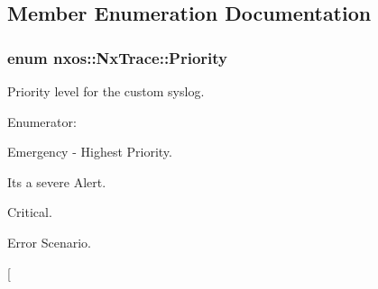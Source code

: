 \subsection{Member Enumeration Documentation}
\hypertarget{classnxos_1_1NxTrace_a582f6e5a22e788c61807657f8bca088f}{
\subsubsection[{Priority}]{\setlength{\rightskip}{0pt plus 5cm}enum {\bf nxos::NxTrace::Priority}}}
\label{classnxos_1_1NxTrace_a582f6e5a22e788c61807657f8bca088f}
Priority level for the custom syslog. \begin{Desc}
\item[Enumerator: ]\par
\begin{description}
\item[{\em 
\hypertarget{classnxos_1_1NxTrace_a582f6e5a22e788c61807657f8bca088fa162b57da846293468dd47af10c603df2}{
EMERG}
\label{classnxos_1_1NxTrace_a582f6e5a22e788c61807657f8bca088fa162b57da846293468dd47af10c603df2}
}]Emergency -\/ Highest Priority. \item[{\em 
\hypertarget{classnxos_1_1NxTrace_a582f6e5a22e788c61807657f8bca088fa8733d052a42f110d6638988de5b6e4e4}{
ALERT}
\label{classnxos_1_1NxTrace_a582f6e5a22e788c61807657f8bca088fa8733d052a42f110d6638988de5b6e4e4}
}]Its a severe Alert. \item[{\em 
\hypertarget{classnxos_1_1NxTrace_a582f6e5a22e788c61807657f8bca088fad47bf23377867d39c4d53d2b2689b4da}{
CTRI}
\label{classnxos_1_1NxTrace_a582f6e5a22e788c61807657f8bca088fad47bf23377867d39c4d53d2b2689b4da}
}]Critical. \item[{\em 
\hypertarget{classnxos_1_1NxTrace_a582f6e5a22e788c61807657f8bca088faeac0f6db2341c975bf8e46d34496eb08}{
ERR}
\label{classnxos_1_1NxTrace_a582f6e5a22e788c61807657f8bca088faeac0f6db2341c975bf8e46d34496eb08}
}]Error Scenario. \item[{\em 
}
\end{description}
\end{Desc}
